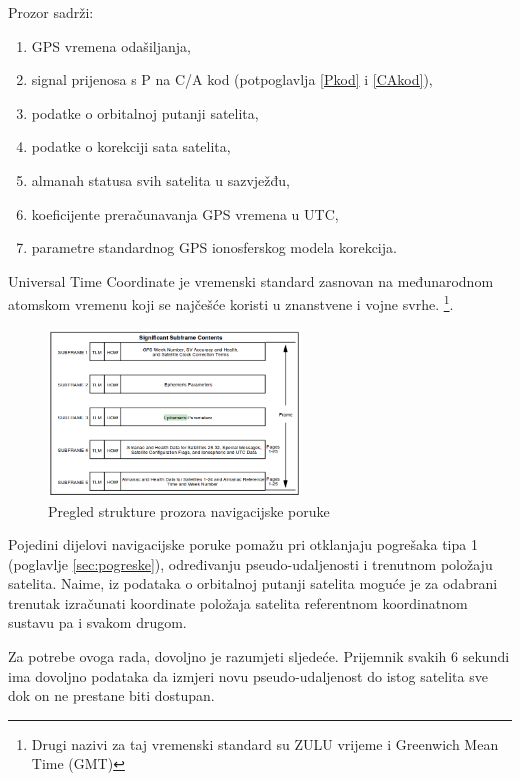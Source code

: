 \documentclass[a4paper,twoside,12pt]{memoir} %
\begin{document}
	Prozor sadrži:
	\begin{enumerate}
		\item GPS vremena odašiljanja,
		\item signal prijenosa s P na C/A kod (potpoglavlja \ref{Pkod} i \ref{CAkod}),
		\item podatke o orbitalnoj putanji satelita,
		\item podatke o korekciji sata satelita,
		\item almanah statusa svih satelita u sazvježđu,
		\item koeficijente preračunavanja GPS vremena u UTC,
		\item parametre standardnog GPS ionosferskog modela korekcija.
	\end{enumerate}
	
	\begin{defn}
		Universal Time Coordinate je vremenski standard zasnovan na međunarodnom atomskom vremenu koji se najčešće koristi u znanstvene i vojne svrhe. \footnote{Drugi nazivi za taj vremenski standard su ZULU vrijeme i Greenwich Mean Time (GMT)}.
	\end{defn}
	
	\begin{figure}[H]
		\centering
		\includegraphics[width=0.6\textwidth]{NACONTENT}
		\caption{Pregled strukture prozora navigacijske poruke\cite{GPS:1}}
		\label{Fig:aaa}
	\end{figure}
	Pojedini dijelovi navigacijske poruke pomažu pri otklanjaju pogrešaka tipa 1  
	(poglavlje \ref{sec:pogreske}), određivanju
	pseudo-udaljenosti i trenutnom položaju satelita.
	Naime, iz podataka o orbitalnoj putanji satelita moguće je za odabrani trenutak izračunati koordinate položaja satelita referentnom koordinatnom sustavu pa i svakom drugom.
	 
	Za potrebe ovoga rada, dovoljno je razumjeti sljedeće.
	Prijemnik svakih 6 sekundi ima dovoljno podataka da izmjeri novu pseudo-udaljenost do istog satelita sve dok on ne prestane biti dostupan. 
	
\end{document}
